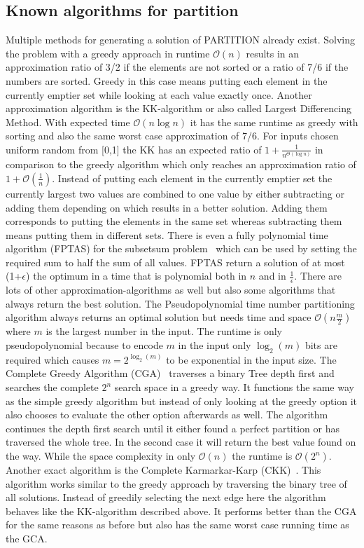 \subsection{Known algorithms for partition}
Multiple methods for generating a solution of PARTITION already exist.
Solving the problem with a greedy approach in runtime $\mathcal{O}(n)$ results in an approximation ratio of 3/2 if the elements are not sorted or a ratio of 7/6 if the numbers are sorted.
Greedy in this case means putting each element in the currently emptier set while looking at each value exactly once.
Another approximation algorithm is the KK-algorithm or also called Largest Differencing Method.
With expected time $\mathcal{O}(n\log{}n)$ it has the same runtime as greedy with sorting and also the same worst case approximation of 7/6.
For inputs chosen uniform random from [0,1] the KK has an expected ratio of \(1+\frac{1}{n^{\Theta(\log{}n)}}\) in comparison to the greedy algorithm which only reaches an approximation ratio of \(1+\mathcal{O}(\frac{1}{n})\).
Instead of putting each element in the currently emptier set the currently largest two values are combined to one value by either subtracting or adding them depending on which results in a better solution.
Adding them corresponds to putting the elements in the same set whereas subtracting them means putting them in different sets. 
There is even a fully polynomial time algorithm (FPTAS) for the subsetsum problem~\cite{KELLERER2003349} which can be used by setting the required sum to half the sum of all values.
FPTAS return a solution of at most (1+$\epsilon$) the optimum in a time that is polynomial both in $n$ and in $\frac{1}{\epsilon}$.
There are lots of other approximation-algorithms as well but also some algorithms that always return the best solution.
The Pseudopolynomial time number partitioning algorithm always returns an optimal solution but needs time and space $\mathcal{O}(n\frac{m}{2})$ where $m$ is the largest number in the input.
The runtime is only pseudopolynomial because to encode $m$ in the input only $\log_{2}{(m)}$ bits are required which causes \(m=2^{\log_{2}{(m)}}\) to be exponential in the input size.
The Complete Greedy Algorithm (CGA)~\cite{korf1998complete} traverses a binary Tree depth first and searches the complete $2^n$ search space in a greedy way.
It functions the same way as the simple greedy algorithm but instead of only looking at the greedy option it also chooses to evaluate the other option afterwards as well.
The algorithm continues the depth first search until it either found a perfect partition or has traversed the whole tree.
In the second case it will return the best value found on the way.
While the space complexity in only $\mathcal{O}(n)$ the runtime is $\mathcal{O}(2^n)$.
Another exact algorithm is the Complete Karmarkar-Karp (CKK)~\cite{korf1998complete}.
This algorithm works similar to the greedy approach by traversing the binary tree of all solutions.
Instead of greedily selecting the next edge here the algorithm behaves like the KK-algorithm described above.
It performs better than the CGA for the same reasons as before but also has the same worst case running time as the GCA.

